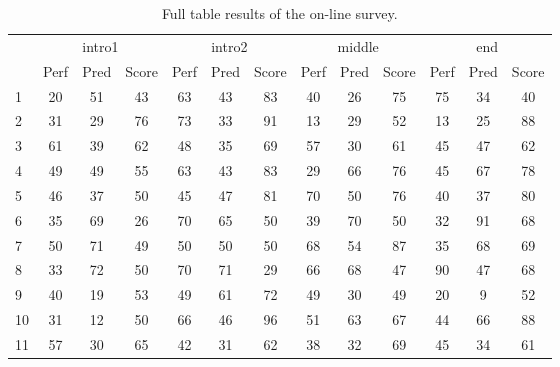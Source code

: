 \begin{table}[ht!]
\centering
  \caption[Full table results of the on-line survey.]{Full table results of the on-line survey.}
  \label{tab:survey_results}
  \footnotesize
\begin{tabular}{l|ccc|ccc|ccc|ccc}

\hline
\multicolumn{1}{c}{\multirow{2}{*}{}} & \multicolumn{3}{c}{intro1} & \multicolumn{3}{c}{intro2} & \multicolumn{3}{c}{middle}  & \multicolumn{3}{c}{end} \\ 
\multicolumn{1}{c}{}                      & \multicolumn{1}{c}{Perf} & \multicolumn{1}{c}{Pred} & \multicolumn{1}{c}{Score} & \multicolumn{1}{c}{Perf} & \multicolumn{1}{c}{Pred} & \multicolumn{1}{c}{Score} & \multicolumn{1}{c}{Perf} & \multicolumn{1}{c}{Pred} & \multicolumn{1}{c}{Score} & \multicolumn{1}{c}{Perf} & \multicolumn{1}{c}{Pred} & \multicolumn{1}{c}{Score} \\ \hline
1 & 20 & 51 & 43 & 63 & 43 & 83 & 40 & 26 & 75 & 75 & 34 & 40 \\ 
2 & 31 & 29 & 76 & 73 & 33 & 91 & 13 & 29 & 52 & 13 & 25 & 88 \\ 
3 & 61 & 39 & 62 & 48 & 35 & 69 & 57 & 30 & 61 & 45 & 47 & 62 \\
4 & 49 & 49 & 55 & 63 & 43 & 83 & 29 & 66 & 76 & 45 & 67 & 78 \\
5 & 46 & 37 & 50 & 45 & 47 & 81 & 70 & 50 & 76 & 40 & 37 & 80 \\ 
6 & 35 & 69 & 26 & 70 & 65 & 50 & 39 & 70 & 50 & 32 & 91 & 68 \\
7 & 50 & 71 & 49 & 50 & 50 & 50 & 68 & 54 & 87 & 35 & 68 & 69 \\
8 & 33 & 72 & 50 & 70 & 71 & 29 & 66 & 68 & 47 & 90 & 47 & 68 \\
9 & 40 & 19 & 53 & 49 & 61 & 72 & 49 & 30 & 49 & 20 & 9 & 52 \\
10 & 31 & 12 & 50 & 66 & 46 & 96 & 51 & 63 & 67 & 44 & 66 & 88 \\ 
11 & 57 & 30 & 65 & 42 & 31 & 62 & 38 & 32 & 69 & 45 & 34 & 61 \\ \hline                  
\end{tabular}

\end{table}